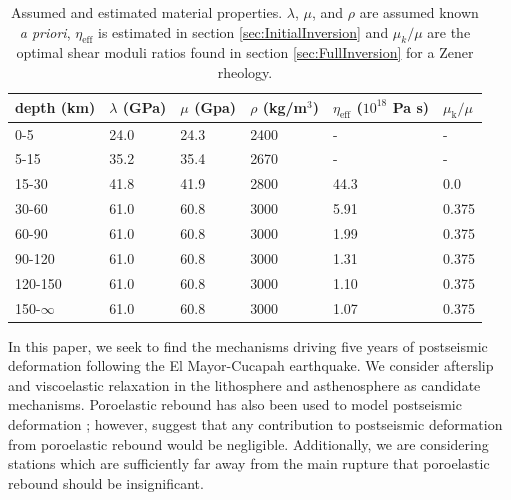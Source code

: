 \documentclass[1p]{elsarticle}
\begin{document}
\begin{table}\label{tab:MaterialProperties}
\begin{tabular} {l l l l l l}
depth (km) &$\lambda$ (GPa)&$\mu$ (Gpa)&$\rho$ (kg/m$^3$)&$\eta_\mathrm{eff}$ ($10^{18}$ Pa s) & $\mu_\mathrm{k}/\mu$\\ \hline
0-5 & 24.0 & 24.3 & 2400 & - & -\\
5-15 & 35.2 & 35.4 & 2670 & - & -\\
15-30 & 41.8 & 41.9 & 2800 & 44.3 & 0.0\\
30-60 & 61.0 & 60.8 & 3000 & 5.91 & 0.375\\
60-90 & 61.0 & 60.8 & 3000 & 1.99 & 0.375\\
90-120 & 61.0 & 60.8 & 3000 & 1.31 & 0.375\\
120-150 & 61.0 & 60.8 & 3000 & 1.10 & 0.375\\
150-$\infty$ & 61.0 & 60.8 & 3000 & 1.07 & 0.375\\
\end{tabular}
\caption{Assumed and estimated material properties. $\lambda$, $\mu$, and $\rho$ are assumed known \textit{a priori}, $\eta_\mathrm{eff}$ is estimated in section \ref{sec:InitialInversion} and $\mu_k/\mu$ are the optimal shear moduli ratios found in section \ref{sec:FullInversion} for a Zener rheology.} 

\end{table}
In this paper, we seek to find the mechanisms driving five years of postseismic deformation following the El Mayor-Cucapah earthquake. We consider afterslip and viscoelastic relaxation in the lithosphere and asthenosphere as candidate mechanisms.  Poroelastic rebound has also been used to model postseismic deformation \citep[e.g.][]{Jonsson2003}; however, \cite{Gonzalez-ortega2014} suggest that any contribution to postseismic deformation from poroelastic rebound would be negligible.  Additionally, we are considering stations which are sufficiently far away from the main rupture that poroelastic rebound should be insignificant.  
\end{document}
